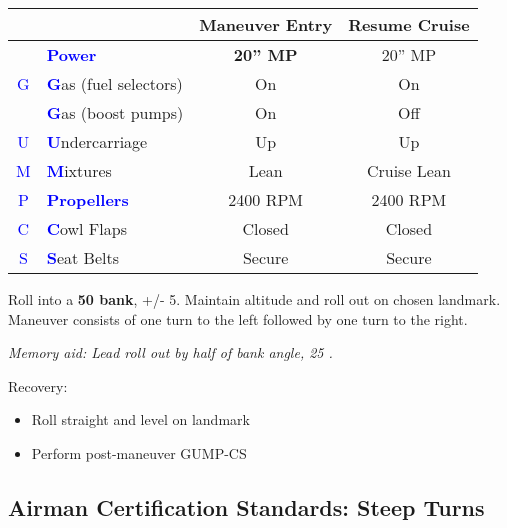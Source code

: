 \begin{table}[H]
\centering
\begin{tabular}{|c|l|c|c|}
\hline
                    &                                                 & \textbf{Maneuver Entry} & \textbf{Resume Cruise} \\ \hline
                    & \textcolor{blue}{\textbf{Power}}                & \textbf{20'' MP}        & 20'' MP                \\ \hline
\textcolor{blue}{G} & \textcolor{blue}{\textbf{G}}as (fuel selectors) & On                      & On                     \\
                    & \textcolor{blue}{\textbf{G}}as (boost pumps)    & On                      & Off                    \\ \hline
\textcolor{blue}{U} & \textcolor{blue}{\textbf{U}}ndercarriage        & Up                      & Up                     \\ \hline
\textcolor{blue}{M} & \textcolor{blue}{\textbf{M}}ixtures             & Lean                    & Cruise Lean            \\ \hline
\textcolor{blue}{P} & \textcolor{blue}{\textbf{Propellers}}           & 2400 RPM                & 2400 RPM               \\ \hline
\textcolor{blue}{C} & \textcolor{blue}{\textbf{C}}owl Flaps           & Closed                  & Closed                 \\ \hline
\textcolor{blue}{S} & \textcolor{blue}{\textbf{S}}eat Belts           & Secure                  & Secure                 \\ \hline
\end{tabular}
\end{table}

Roll into a \textbf{50\degree{} bank}, +/- 5\degree{}. Maintain altitude and roll out on chosen landmark.
Maneuver consists of one turn to the left followed by one turn to the right.

\emph{Memory aid: Lead roll out by half of bank angle, 25 \degree{}.}

Recovery:
\begin{itemize}[label={}]
\item Roll straight and level on landmark
\item Perform post-maneuver GUMP-CS
\end{itemize}

\newpage 

\subsection{Airman Certification Standards: Steep Turns}

